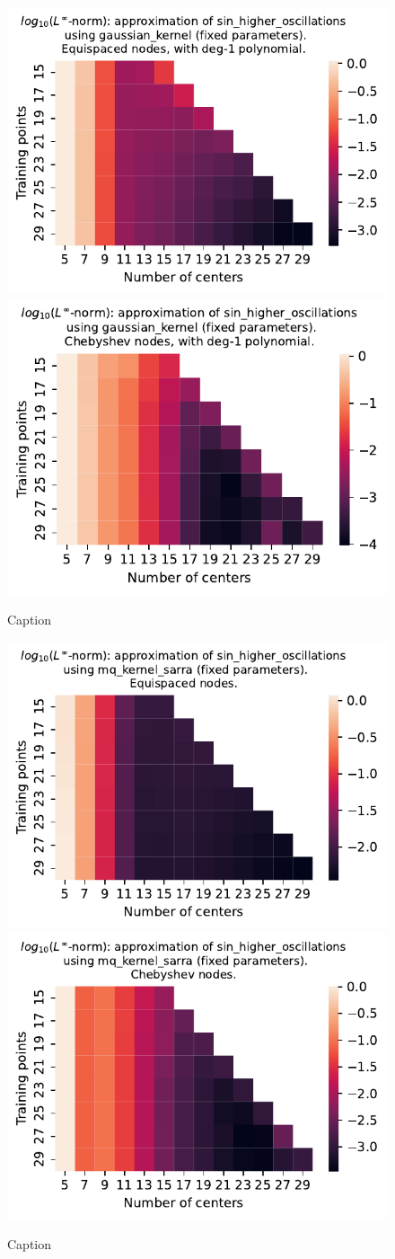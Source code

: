 \documentclass[12pt]{report} %
\begin{document}
\begin{figure}[ht]
  \centering
  \includegraphics[width=.49\textwidth]{imagenes/experiments/1d/least_squares/opt-sin_higher_oscillations-Kgaussian_kernel-Poly-Equi.pdf}
  \includegraphics[width=.49\textwidth]{imagenes/experiments/1d/least_squares/opt-sin_higher_oscillations-Kgaussian_kernel-Poly-Cheb.pdf}
  \caption{Caption}
  \label{fig:opt-sin-higher-oscillations-gaussian-poly}
\end{figure}

\begin{figure}[ht]
  \centering

  \includegraphics[width=.49\textwidth]{imagenes/experiments/1d/least_squares/opt-sin_higher_oscillations-Kmq_kernel_sarra-Equi.pdf}
  \includegraphics[width=.49\textwidth]{imagenes/experiments/1d/least_squares/opt-sin_higher_oscillations-Kmq_kernel_sarra-Cheb.pdf}
  \caption{Caption}
  \label{fig:opt-sin-higher-oscillations-sarra}
\end{figure}
\end{document}
